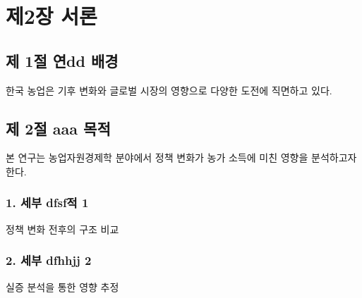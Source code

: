 
\chapter{제2장 서론}


\section{제 1절 연dd 배경}
한국 농업은 기후 변화와 글로벌 시장의 영향으로 다양한 도전에 직면하고 있다.

\section{제 2절 aaa 목적}
본 연구는 농업자원경제학 분야에서 정책 변화가 농가 소득에 미친 영향을 분석하고자 한다.

\subsection{1. 세부 dfsf적 1}
정책 변화 전후의 구조 비교

\subsection{2. 세부 dfhhjj 2}
실증 분석을 통한 영향 추정